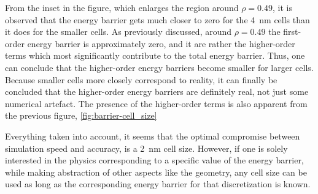 \documentclass[11pt,a4paper,english]{article}
\begin{document}
From the inset in the figure, which enlarges the region around $\rho=0.49$, it is observed that the energy barrier gets much closer to zero for the \SI{4}{\nano\metre} cells than it does for the smaller cells. As previously discussed, around $\rho=0.49$ the first-order energy barrier is approximately zero, and it are rather the higher-order terms which most significantly contribute to the total energy barrier. Thus, one can conclude that the higher-order energy barriers become smaller for larger cells. Because smaller cells more closely correspond to reality, it can finally be concluded that the higher-order energy barriers are definitely real, not just some numerical artefact. The presence of the higher-order terms is also apparent from the previous figure, \cref{fig:barrier-cell_size} \par
Everything taken into account, it seems that the optimal compromise between simulation speed and accuracy, is a \SI{2}{\nano\metre} cell size. However, if one is solely interested in the physics corresponding to a specific value of the energy barrier, while making abstraction of other aspects like the geometry, any cell size can be used as long as the corresponding energy barrier for that discretization is known.
\end{document}
